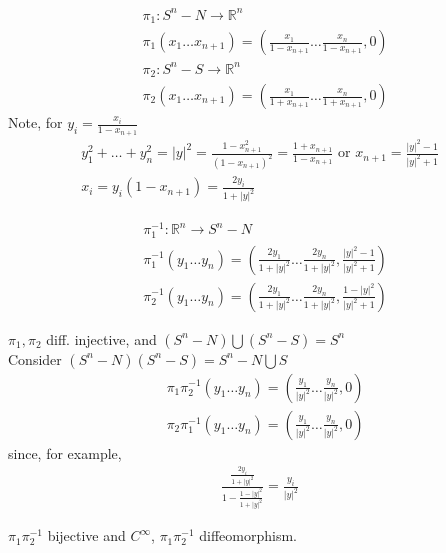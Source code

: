 \documentclass[twoside]{amsart}
\begin{document}
\[
\begin{aligned}
  & \pi_1: S^n - N \to \mathbb{R}^n \\ 
  & \pi_1(x_1 \dots x_{n+1}) = \left( \frac{x_1}{ 1 - x_{n+1} } \dots \frac{x_n}{ 1 - x_{n+1} } , 0 \right) \\ 
  & \pi_2 : S^n -S \to \mathbb{R}^n \\ 
  & \pi_2(x_1 \dots x_{n+1}) = \left( \frac{x_1}{ 1 + x_{n+1}} \dots \frac{x_n}{ 1 + x_{n+1} }, 0 \right)
\end{aligned}
\]
Note, for $y_i = \frac{x_i}{ 1 - x_{n+1}}$
\[
\begin{gathered}
  y_1^2 + \dots +y_n^2 = |y|^2 = \frac{1-  x_{n+1}^2}{ (1-x_{n+1})^2 } = \frac{1+ x_{n+1}}{ 1- x_{n+1}} \text{ or } x_{n+1}  = \frac{ |y|^2 - 1 }{ |y|^2 + 1 }  \\
  x_i = y _i (1- x_{n+1}) = \frac{2y_i}{ 1 + |y|^2 }
\end{gathered}
\]

\[
\begin{aligned}
  & \pi_1^{-1}: \mathbb{R}^n \to S^n - N \\ 
  & \pi_1^{-1}(y_1 \dots y_n) = \left( \frac{2y_1}{ 1 + |y|^2 } \dots \frac{2y_n}{1+ |y|^2 } , \frac{ |y|^2 - 1 }{ |y|^2 + 1 } \right) \\ 
  & \pi_2^{-1}(y_1 \dots y_n) = \left( \frac{2y_1}{ 1 + |y|^2 } \dots \frac{2y_n}{1+ |y|^2 } , \frac{ 1 - |y|^2  }{ |y|^2 + 1 } \right)
\end{aligned}
\]

$\pi_1,\pi_2$ diff. injective, and $(S^n - N ) \bigcup (S^n-S) = S^n$ \\

Consider $(S^n - N)(S^n-S) = S^n - N \bigcup S$ 
\[
\begin{aligned}
  & \pi_1 \pi_2^{-1}(y_1 \dots y_n) = \left( \frac{y_1 }{ |y|^2} \dots \frac{y_n}{|y|^2} , 0 \right) \\ 
  & \pi_2 \pi_1^{-1}(y_1 \dots y_n) = \left( \frac{y_1 }{ |y|^2} \dots \frac{y_n}{|y|^2} , 0 \right) 
\end{aligned}
\]
since, for example, 
\[
\begin{gathered}
\frac{   \frac{2y_i }{ 1 + |y|^2} }{ 1 - \frac{ 1 - |y|^2}{ 1 + |y|^2 }} = \frac{y_i }{ |y|^2 }
\end{gathered}
\]



$\pi_1 \pi_2^{-1}$ bijective and $C^{\infty}$, $\pi_1 \pi_2^{-1}$ diffeomorphism.   \\
\end{document}
